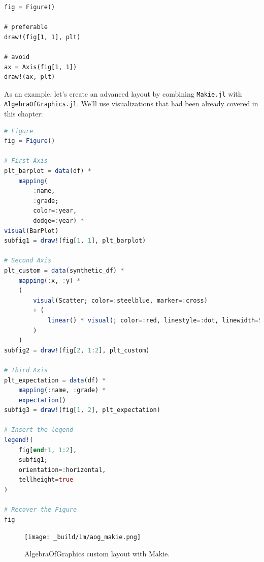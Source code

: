 \documentclass[
  notoc %
]{tufte-book}
\newcommand{\passthrough}[1]{#1}
\begin{document}
\begin{lstlisting}
fig = Figure()

# preferable
draw!(fig[1, 1], plt)

# avoid
ax = Axis(fig[1, 1])
draw!(ax, plt)
\end{lstlisting}

As an example, let's create an advanced layout by combining
\passthrough{\lstinline!Makie.jl!} with
\passthrough{\lstinline!AlgebraOfGraphics.jl!}. We'll use visualizations
that had been already covered in this chapter:

\begin{lstlisting}[language=Julia]
# Figure
fig = Figure()

# First Axis
plt_barplot = data(df) *
    mapping(
        :name,
        :grade;
        color=:year,
        dodge=:year) *
visual(BarPlot)
subfig1 = draw!(fig[1, 1], plt_barplot)

# Second Axis
plt_custom = data(synthetic_df) *
    mapping(:x, :y) *
    (
        visual(Scatter; color=:steelblue, marker=:cross)
        + (
            linear() * visual(; color=:red, linestyle=:dot, linewidth=5)
        )
    )
subfig2 = draw!(fig[2, 1:2], plt_custom)

# Third Axis
plt_expectation = data(df) *
    mapping(:name, :grade) *
    expectation()
subfig3 = draw!(fig[1, 2], plt_expectation)

# Insert the legend
legend!(
    fig[end+1, 1:2],
    subfig1;
    orientation=:horizontal,
    tellheight=true
)

# Recover the Figure
fig
\end{lstlisting}

\begin{figure}
\hypertarget{fig:aog_makie}{%
\centering
\texttt{[image: \_build/im/aog\_makie.png]}
\caption{AlgebraOfGraphics custom layout with
Makie.}\label{fig:aog_makie}
}
\end{figure}
\end{document}
